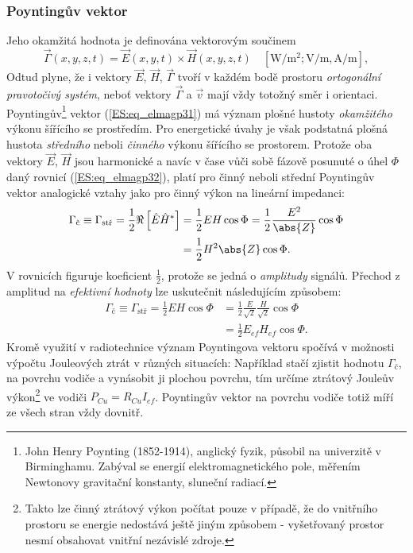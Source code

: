       \subsubsection{Poyntingův vektor}
        Jeho okamžitá hodnota je definována vektorovým součinem
        \begin{equation}\label{ES:eq_elmagp31}
          \vec{\Gamma}(x,y,z,t)=\vec{E}(x,y,t)\times\vec{H}(x,y,z,t)
          \quad [\unit{\W\per\square\m}; \unit{\V\per\m}, 
                 \unit{\A\per\m}],
        \end{equation}
        Odtud plyne, že i vektory \(\vec{E}\), \(\vec{H}\), \(\vec{\Gamma}\) tvoří v každém bodě 
        prostoru \emph{ortogonální pravotočivý systém}, neboť vektory \(\vec{\Gamma}\) a 
        \(\vec{v}\) mají vždy totožný směr i orientaci. Poyntingův\footnote{John Henry Poynting 
        (1852-1914), anglický fyzik, působil na univerzitě v Birminghamu. Zabýval se energií 
        elektromagnetického pole, měřením Newtonovy gravitační konstanty, sluneční radiací.} 
        vektor (\ref{ES:eq_elmagp31}) má význam plošné hustoty \emph{okamžitého} výkonu šířícího 
        se prostředím. Pro energetické úvahy je však podstatná plošná hustota \emph{středního} 
        neboli \emph{činného} výkonu šířícího se prostorem. Protože oba vektory \(\vec{E}\), 
        \(\vec{H}\) jsou harmonické a navíc v čase vůči sobě fázově posunuté o úhel \(\Phi\) daný 
        rovnicí (\ref{ES:eq_elmagp32}), platí pro činný neboli střední Poyntingův vektor 
        analogické vztahy jako pro činný výkon na lineární impedanci:
        \begin{align}\label{ES:eq_elmagp33}
          \Gamma_\text{č} \equiv \Gamma_\text{stř} 
            = \frac{1}{2}\Re\left[\hat{E}\hat{H}^*\right]
            &= \frac{1}{2}EH\cos\Phi 
            = \frac{1}{2}\frac{E^2}{\abs{Z}}\cos\Phi                  \nonumber \\
            &= \frac{1}{2}H^2\abs{Z}\cos\Phi.
        \end{align}
        V rovnicích figuruje koeficient \(\frac{1}{2}\), protože se jedná o \emph{amplitudy} 
        signálů. Přechod z amplitud na \emph{efektivní hodnoty} lze uskutečnit následujícím 
        způsobem:
        \begin{align}\label{ES:eq_elmagp34}
          \Gamma_\text{č} \equiv \Gamma_\text{stř} 
            = \frac{1}{2}EH\cos\Phi 
            &= \frac{1}{2}\frac{E}{\sqrt{2}}\frac{H}{\sqrt{2}}\cos\Phi   \nonumber \\
            &= \frac{1}{2}E_{ef}H_{ef}\cos\Phi.
        \end{align}
        Kromě využití v radiotechnice význam Poyntingova vektoru spočívá v možnosti výpočtu
        Jouleových ztrát v různých situacích: Například stačí zjistit hodnotu \(\Gamma_\text{č}\), 
        na povrchu vodiče a vynásobit ji plochou povrchu, tím určíme ztrátový Jouleův 
        výkon\footnote{Takto lze činný ztrátový výkon počítat pouze v případě, že do vnitřního 
        prostoru se energie nedostává ještě jiným způsobem - vyšetřovaný prostor nesmí obsahovat 
        vnitřní nezávislé zdroje.} ve vodiči \(P_{Cu} = R_{Cu}I_{ef}\). Poyntingův vektor na 
        povrchu vodiče totiž míří ze všech stran vždy dovnitř.
        
